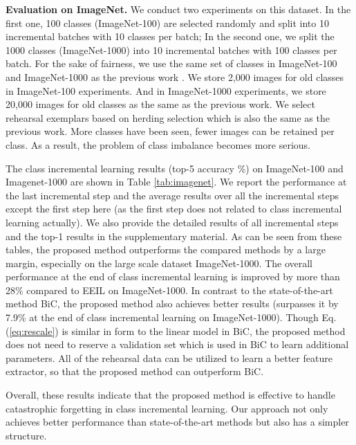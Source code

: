 \documentclass[10pt,twocolumn,letterpaper]{article}
\begin{document}
\noindent\textbf{Evaluation on ImageNet.}
We conduct two experiments on this dataset. In the first one, 100 classes (ImageNet-100) are selected randomly and split into 10 incremental batches with 10 classes per batch; In the second one, we split the 1000 classes (ImageNet-1000) into 10 incremental batches with 100 classes per batch. For the sake of fairness, we use the same set of classes in ImageNet-100 and ImageNet-1000 as the previous work \cite{wu2019large}. We store 2,000 images for old classes in ImageNet-100 experiments. And in ImageNet-1000 experiments, we store 20,000 images for old classes as the same as the previous work. We select rehearsal exemplars based on herding selection \cite{Welling2009HerdingDW} which is also the same as the previous work. More classes have been seen, fewer images can be retained per class. As a result, the problem of class imbalance becomes more serious. 

The class incremental learning results (top-5 accuracy \%) on ImageNet-100 and Imagenet-1000 are shown in Table \ref{tab:imagenet}. We report the performance at the last incremental step and the average results over all the incremental steps except the first step here (as the first step does not related to class incremental learning actually). We also provide the detailed results of all incremental steps and the top-1 results in the supplementary material. As can be seen from these tables, the proposed method outperforms the compared methods by a large margin, especially on the large scale dataset ImageNet-1000. The overall performance at the end of class incremental learning is improved by more than 28\% compared to EEIL on ImageNet-1000. In contrast to the state-of-the-art method BiC, the proposed method also achieves better results (surpasses it by 7.9\% at the end of class incremental learning on ImageNet-1000). Though Eq.(\ref{eq:rescale}) is similar in form to the linear model in BiC, the proposed method does not need to reserve a validation set which is used in BiC to learn additional parameters. All of the rehearsal data can be utilized to learn a better feature extractor, so that the proposed method can outperform BiC.

Overall, these results indicate that the proposed method is effective to handle catastrophic forgetting in class incremental learning. Our approach not only achieves better performance than state-of-the-art methods but also has a simpler structure.
\end{document}
